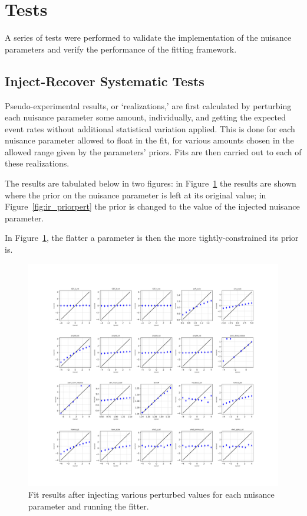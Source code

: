 \documentclass[main.tex]{subfiles}
\begin{document}
\section{Tests}

A series of tests were performed to validate the implementation of the nuisance parameters and verify the performance of the fitting framework. 

\subsection{Inject-Recover Systematic Tests}

Pseudo-experimental results, or `realizations,' are first calculated by perturbing each nuisance parameter some amount, individually, and getting the expected event rates without additional statistical variation applied. 
This is done for each nuisance parameter allowed to float in the fit, for various amounts chosen in the allowed range given by the parameters' priors. 
Fits are then carried out to each of these realizations.

The results are tabulated below in two figures: in Figure~\ref{fig:ir_nopriorpert} the results are shown where the prior on the nuisance parameter is left at its original value; in Figure~\ref{fig:ir_priorpert} the prior is changed to the value of the injected nuisance parameter. 

In Figure~\ref{fig:ir_nopriorpert}, the flatter a parameter is then the more tightly-constrained its prior is. 

\begin{figure}
    \centering 
    \includegraphics[width=0.7\linewidth]{figures/inject_recover_syst.png}
    \caption{Fit results after injecting various perturbed values for each nuisance parameter and running the fitter. }\label{fig:ir_nopriorpert}
\end{figure}
\end{document}
